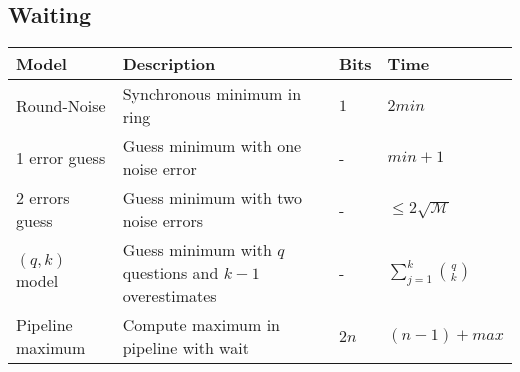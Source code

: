 \subsection{Waiting}
\begin{table}[h]
\begin{tabular}{llll}
			\textbf{Model}		& \textbf{Description}					& \textbf{Bits}			& \textbf{Time} \\
	\hline 	Round-Noise 		& Synchronous minimum in ring			& $1$					& $2min$ \\
	\hline 	1 error guess 		& Guess minimum with one noise error	& -						& $min + 1$ \\
	\hline 	2 errors guess 		& Guess minimum with two noise errors	& -						& $\leq 2\sqrt{\mathcal{M}}$ \\
	\hline 	$(q,k)$ model 		& Guess minimum with $q$ questions and $k - 1$ overestimates	
																		& -						& $\sum_{j=1}^{k}{{q}\choose{k}}$ \\
	\hline 	Pipeline maximum 	& Compute maximum in pipeline with wait		& $2n$				 & $(n - 1) + max$ \\
\end{tabular}
\end{table}

